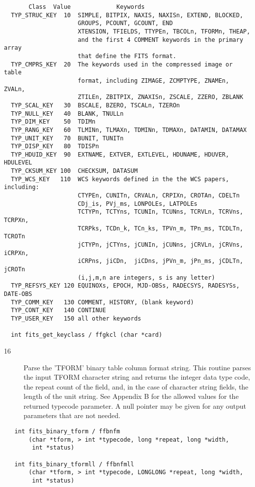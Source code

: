 \documentclass[11pt]{book}
\begin{document}
\begin{verbatim}
       Class  Value             Keywords
  TYP_STRUC_KEY  10  SIMPLE, BITPIX, NAXIS, NAXISn, EXTEND, BLOCKED,
                     GROUPS, PCOUNT, GCOUNT, END
                     XTENSION, TFIELDS, TTYPEn, TBCOLn, TFORMn, THEAP,
                     and the first 4 COMMENT keywords in the primary array
                     that define the FITS format.
  TYP_CMPRS_KEY  20  The keywords used in the compressed image or table
                     format, including ZIMAGE, ZCMPTYPE, ZNAMEn, ZVALn,
                     ZTILEn, ZBITPIX, ZNAXISn, ZSCALE, ZZERO, ZBLANK
  TYP_SCAL_KEY   30  BSCALE, BZERO, TSCALn, TZEROn
  TYP_NULL_KEY   40  BLANK, TNULLn
  TYP_DIM_KEY    50  TDIMn
  TYP_RANG_KEY   60  TLMINn, TLMAXn, TDMINn, TDMAXn, DATAMIN, DATAMAX
  TYP_UNIT_KEY   70  BUNIT, TUNITn
  TYP_DISP_KEY   80  TDISPn
  TYP_HDUID_KEY  90  EXTNAME, EXTVER, EXTLEVEL, HDUNAME, HDUVER, HDULEVEL
  TYP_CKSUM_KEY 100  CHECKSUM, DATASUM
  TYP_WCS_KEY   110  WCS keywords defined in the the WCS papers, including:
                     CTYPEn, CUNITn, CRVALn, CRPIXn, CROTAn, CDELTn
                     CDj_is, PVj_ms, LONPOLEs, LATPOLEs
                     TCTYPn, TCTYns, TCUNIn, TCUNns, TCRVLn, TCRVns, TCRPXn,
                     TCRPks, TCDn_k, TCn_ks, TPVn_m, TPn_ms, TCDLTn, TCROTn
                     jCTYPn, jCTYns, jCUNIn, jCUNns, jCRVLn, jCRVns, iCRPXn,
                     iCRPns, jiCDn,  jiCDns, jPVn_m, jPn_ms, jCDLTn, jCROTn
                     (i,j,m,n are integers, s is any letter)
  TYP_REFSYS_KEY 120 EQUINOXs, EPOCH, MJD-OBSs, RADECSYS, RADESYSs, DATE-OBS
  TYP_COMM_KEY   130 COMMENT, HISTORY, (blank keyword)
  TYP_CONT_KEY   140 CONTINUE
  TYP_USER_KEY   150 all other keywords

  int fits_get_keyclass / ffgkcl (char *card)
\end{verbatim}

\begin{description}
\item[16] Parse the 'TFORM' binary table column format string.
    This routine parses the input TFORM character string and returns the
    integer data type code, the repeat count of the field, and, in the case
    of character string fields, the length of the unit string.  See Appendix
    B for the allowed values for the returned typecode parameter.  A
   null pointer may be given for any output parameters that are not needed. \label{ffbnfm}
\end{description}

\begin{verbatim}
   int fits_binary_tform / ffbnfm
       (char *tform, > int *typecode, long *repeat, long *width,
        int *status)

   int fits_binary_tformll / ffbnfmll
       (char *tform, > int *typecode, LONGLONG *repeat, long *width,
        int *status)
\end{verbatim}
\end{document}
